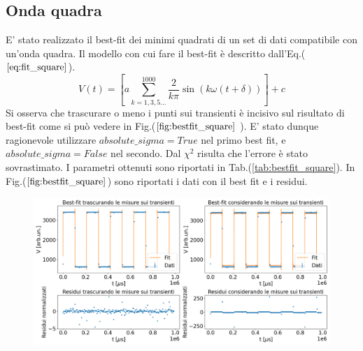 \documentclass{article}
\begin{document}
    \subsection{Onda quadra}
            E' stato realizzato il best-fit dei minimi quadrati
            di un set di dati compatibile con un'onda quadra.
            Il modello con cui fare il best-fit è descritto dall'Eq.($\ref{eq:fit_square}$).
                \begin{equation}
                    V(t) = \left[a\sum_{k=1,3,5...}^{1000} \frac{2}{k\pi}\sin\left(k\omega (t+\delta)\right)\right] +c
                    \label{eq:fit_square}
                \end{equation}
            Si osserva che trascurare o meno i punti sui transienti è incisivo
            sul risultato di best-fit come si può vedere in Fig.($\ref{fig:bestfit_square}$ ).
            E' stato dunque ragionevole utilizzare $absolute\_ sigma=True$
            nel primo best fit, e $absolute\_ sigma=False$ nel secondo.
            Dal $\chi^2$ risulta che l'errore è stato sovrastimato. 
            I parametri ottenuti sono riportati in Tab.(\ref{tab:bestfit_square}).
            In Fig.($\ref{fig:bestfit_square}$) sono riportati i dati con il best fit e 
            i residui.
            

            \begin{figure}[H]
                \centering
                \includegraphics[width=1\textwidth]{bestfit_squarewave.png} %
                \caption{                }
                \label{fig:bestfit_square}
            \end{figure}     
            
\end{document}
